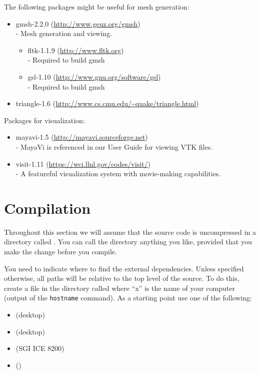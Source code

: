 The following packages might be useful for mesh generation:
\begin{itemize}
 \item gmsh-2.2.0 (\url{http://www.geuz.org/gmsh}) \\-
    Mesh generation and viewing.
  \begin{itemize}
   \item fltk-1.1.9 (\url{http://www.fltk.org}) \\-
    Required to build gmsh 
   \item gsl-1.10 (\url{http://www.gnu.org/software/gsl}) \\-
    Required to build gmsh 
  \end{itemize}
 \item triangle-1.6 (\url{http://www.cs.cmu.edu/~quake/triangle.html}) 
\end{itemize}

Packages for visualization:
\begin{itemize}
 \item mayavi-1.5 (\url{http://mayavi.sourceforge.net}) \\-
    MayaVi is referenced in our User Guide for viewing VTK files.
 \item visit-1.11 (\url{https://wci.llnl.gov/codes/visit/}) \\-
    A featureful visualization system with movie-making capabilities.
\end{itemize}

\section{Compilation}\label{sec:compilesrc}
Throughout this section we will assume that the source code is uncompressed in a directory called .
You can call the directory anything you like, provided that you make the change before you compile.

You need to indicate where to find the external dependencies.
Unless specified otherwise, all paths will be relative to the top level of the source.
To do this, create a file in the  directory called  where ``x'' is the name of your computer (output of the \texttt{hostname} command).
As a starting point use one of the following:
\begin{itemize}
 \item {} (\linux desktop)
\item {} (\macosx desktop)
\item {} (SGI ICE 8200)
\item {} (\winxp)
\end{itemize}

